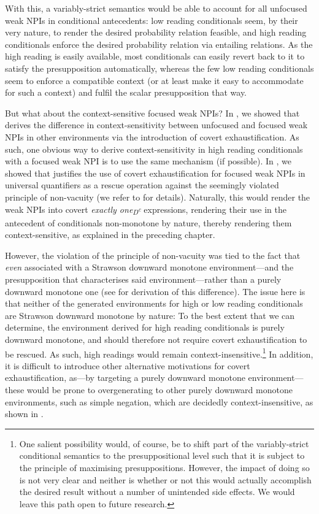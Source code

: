 With this, a variably-strict semantics would be able to account for all unfocused weak NPIs in conditional antecedents: low reading conditionals seem, by their very nature, to render the desired probability relation feasible, and high reading conditionals enforce the desired probability relation via entailing relations. As the high reading is easily available, most conditionals can easily revert back to it to satisfy the presupposition automatically, whereas the few low reading conditionals seem to enforce a compatible context (or at least make it easy to accommodate for such a context) and fulfil the scalar presupposition that way.

But what about the context-sensitive focused weak NPIs? In , we showed that \textcite{Crnic2014-dogma,Crnic2014-nm} derives the difference in context-sensitivity between unfocused and focused weak NPIs in other environments via the introduction of covert exhaustification. As such, one obvious way to derive context-sensitivity in high reading conditionals with a focused weak NPI is to use the same mechanism (if possible). In , we showed that \textcite{Crnic2014-dogma,Crnic2014-nm} justifies the use of covert exhaustification for focused weak NPIs in universal quantifiers as a rescue operation against the seemingly violated principle of non-vacuity (we refer to  for details). Naturally, this would render the weak NPIs into covert \textit{exactly one\textsubscript{D\textsuperscript{c}}} expressions, rendering their use in the antecedent of conditionals non-monotone by nature, thereby rendering them context-sensitive, as explained in the preceding chapter. 

However, the violation of the principle of non-vacuity was tied to the fact that \textit{even} associated with a Strawson downward monotone environment---and the presupposition that characterises said environment---rather than a purely downward monotone one (see  for  derivation of this difference). The issue here is that neither of the generated environments for high or low reading conditionals are Strawson downward monotone by nature: To the best extent that we can determine, the environment derived for high reading conditionals is purely downward monotone, and should therefore not require covert exhaustification to be rescued. As such, high readings would remain context-insensitive.\footnote{One salient possibility would, of course, be to shift part of the variably-strict conditional semantics to the presuppositional level such that it is subject to the principle of maximising presuppositions. However, the impact of doing so is not very clear and neither is whether or not this would actually accomplish the desired result without a number of unintended side effects. We would leave this path open to future research.} In addition, it is difficult to introduce other alternative motivations for covert exhaustification, as---by targeting a purely downward monotone environment---these would be prone to overgenerating to other purely downward monotone environments, such as simple negation, which are decidedly context-insensitive, as shown in .

